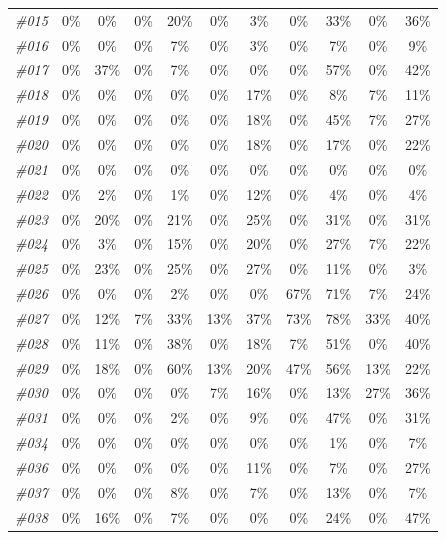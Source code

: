 \begin{table}[t]
\begin{tabular}{ccccccccccc}
      \textit{\#015} & 0\% & 0\% & 0\% & 20\% & 0\% & 3\% & 0\% & 33\% & 0\% & 36\% \\
      \textit{\#016} & 0\% & 0\% & 0\% & 7\% & 0\% & 3\% & 0\% & 7\% & 0\% & 9\% \\
      \textit{\#017} & 0\% & 37\% & 0\% & 7\% & 0\% & 0\% & 0\% & 57\% & 0\% & 42\% \\
      \textit{\#018} & 0\% & 0\% & 0\% & 0\% & 0\% & 17\% & 0\% & 8\% & 7\% & 11\% \\
      \textit{\#019} & 0\% & 0\% & 0\% & 0\% & 0\% & 18\% & 0\% & 45\% & 7\% & 27\% \\
      \textit{\#020} & 0\% & 0\% & 0\% & 0\% & 0\% & 18\% & 0\% & 17\% & 0\% & 22\% \\
      \textit{\#021} & 0\% & 0\% & 0\% & 0\% & 0\% & 0\% & 0\% & 0\% & 0\% & 0\% \\
      \textit{\#022} & 0\% & 2\% & 0\% & 1\% & 0\% & 12\% & 0\% & 4\% & 0\% & 4\% \\
      \textit{\#023} & 0\% & 20\% & 0\% & 21\% & 0\% & 25\% & 0\% & 31\% & 0\% & 31\% \\
      \textit{\#024} & 0\% & 3\% & 0\% & 15\% & 0\% & 20\% & 0\% & 27\% & 7\% & 22\% \\
      \textit{\#025} & 0\% & 23\% & 0\% & 25\% & 0\% & 27\% & 0\% & 11\% & 0\% & 3\% \\
      \textit{\#026} & 0\% & 0\% & 0\% & 2\% & 0\% & 0\% & 67\% & 71\% & 7\% & 24\% \\
      \textit{\#027} & 0\% & 12\% & 7\% & 33\% & 13\% & 37\% & 73\% & 78\% & 33\% & 40\% \\
      \textit{\#028} & 0\% & 11\% & 0\% & 38\% & 0\% & 18\% & 7\% & 51\% & 0\% & 40\% \\
      \textit{\#029} & 0\% & 18\% & 0\% & 60\% & 13\% & 20\% & 47\% & 56\% & 13\% & 22\% \\
      \textit{\#030} & 0\% & 0\% & 0\% & 0\% & 7\% & 16\% & 0\% & 13\% & 27\% & 36\% \\
      \textit{\#031} & 0\% & 0\% & 0\% & 2\% & 0\% & 9\% & 0\% & 47\% & 0\% & 31\% \\
      \textit{\#034} & 0\% & 0\% & 0\% & 0\% & 0\% & 0\% & 0\% & 1\% & 0\% & 7\% \\
      \textit{\#036} & 0\% & 0\% & 0\% & 0\% & 0\% & 11\% & 0\% & 7\% & 0\% & 27\% \\
      \textit{\#037} & 0\% & 0\% & 0\% & 8\% & 0\% & 7\% & 0\% & 13\% & 0\% & 7\% \\
      \textit{\#038} & 0\% & 16\% & 0\% & 7\% & 0\% & 0\% & 0\% & 24\% & 0\% & 47\% \\

\end{tabular}
\end{table}
